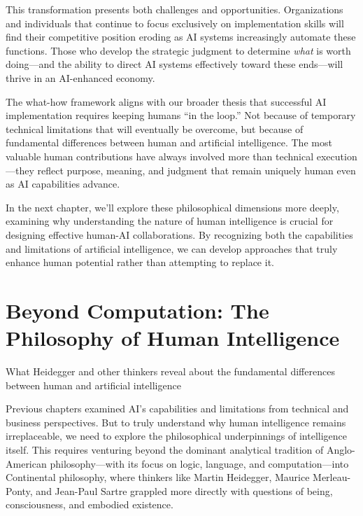 \documentclass[
  Letterpaper,
]{scrbook}
\begin{document}
This transformation presents both challenges and opportunities.
Organizations and individuals that continue to focus exclusively on
implementation skills will find their competitive position eroding as AI
systems increasingly automate these functions. Those who develop the
strategic judgment to determine \emph{what} is worth doing---and the
ability to direct AI systems effectively toward these ends---will thrive
in an AI-enhanced economy.

The what-how framework aligns with our broader thesis that successful AI
implementation requires keeping humans ``in the loop.'' Not because of
temporary technical limitations that will eventually be overcome, but
because of fundamental differences between human and artificial
intelligence. The most valuable human contributions have always involved
more than technical execution---they reflect purpose, meaning, and
judgment that remain uniquely human even as AI capabilities advance.

In the next chapter, we'll explore these philosophical dimensions more
deeply, examining why understanding the nature of human intelligence is
crucial for designing effective human-AI collaborations. By recognizing
both the capabilities and limitations of artificial intelligence, we can
develop approaches that truly enhance human potential rather than
attempting to replace it.


\chapter{Beyond Computation: The Philosophy of Human
Intelligence}\label{beyond-computation-the-philosophy-of-human-intelligence}

What Heidegger and other thinkers reveal about the fundamental
differences between human and artificial intelligence

\hfill\break

Previous chapters examined AI's capabilities and limitations from
technical and business perspectives. But to truly understand why human
intelligence remains irreplaceable, we need to explore the philosophical
underpinnings of intelligence itself. This requires venturing beyond the
dominant analytical tradition of Anglo-American philosophy---with its
focus on logic, language, and computation---into Continental philosophy,
where thinkers like Martin Heidegger,
Maurice Merleau-Ponty, and Jean-Paul Sartre grappled more directly with
questions of being, consciousness, and embodied existence.
\end{document}
